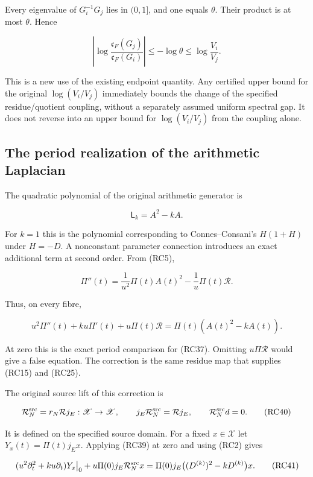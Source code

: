 Every eigenvalue of \(G_i^{-1}G_j\) lies in \((0,1]\), and one equals \(\theta\). Their product is at most \(\theta\). Hence

\[
\boxed{\left|\log\frac{\mathfrak c_F(G_j)}{\mathfrak c_F(G_i)}\right|
\leq-\log\theta\leq\log\frac{V_i}{V_j}.}
\tag{RC36}
\]

This is a new use of the existing endpoint quantity. Any certified upper bound for the original \(\log(V_i/V_j)\) immediately bounds the change of the specified residue/quotient coupling, without a separately assumed uniform spectral gap. It does not reverse into an upper bound for \(\log(V_i/V_j)\) from the coupling alone.

\subsection{The period realization of the arithmetic Laplacian}\label{endpoint-residue_original--the-period-realization-of-the-arithmetic-laplacian}

The quadratic polynomial of the original arithmetic generator is

\[
\mathsf L_k=A^2-kA.
\tag{RC37}
\]

For \(k=1\) this is the polynomial corresponding to Connes--Consani's \(H(1+H)\) under \(H=-D\). A nonconstant parameter connection introduces an exact additional term at second order. From (RC5),

\[
\Pi''(t)=\frac1{u^2}\Pi(t)A(t)^2
-\frac1u\Pi(t)\mathcal R.
\tag{RC38}
\]

Thus, on every fibre,

\[
\boxed{u^2\Pi''(t)+ku\Pi'(t)+u\Pi(t)\mathcal R
=\Pi(t)(A(t)^2-kA(t)).}
\tag{RC39}
\]

At zero this is the exact period comparison for (RC37). Omitting \(u\Pi\mathcal R\) would give a false equation. The correction is the same residue map that supplies (RC15) and (RC25).

The original source lift of this correction is

\[
\mathcal R_N^{\rm src}=r_N\mathcal Rj_E:\mathscr X\to\mathscr X,
\qquad j_E\mathcal R_N^{\rm src}=\mathcal Rj_E,
\qquad \mathcal R_N^{\rm src}d=0.
\tag{RC40}
\]

It is defined on the specified source domain. For a fixed \(x\in\mathscr X\) let \(Y_x(t)=\Pi(t)j_Ex\). Applying (RC39) at zero and using (RC2) gives

\[
\begin{split}
\left.(u^2\partial_t^2+ku\partial_t)Y_x\right|_{0}
+u\Pi(0)j_E\mathcal R_N^{\rm src}x
=\Pi(0)j_E\bigl((D^{(k)})^2-kD^{(k)}\bigr)x.
\end{split}
\tag{RC41}
\]

